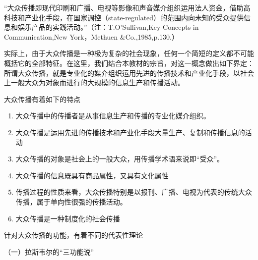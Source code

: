 \documentclass[UTF8,12pt]{ctexart}
\numberwithin{equation}{section} %
\numberwithin{figure}{section}
\numberwithin{table}{section}
\begin{document}
	“大众传播即现代印刷和广播、电视等影像和声音媒介组织运用法人资金，借助高科技和产业化手段，在国家调控（state-regulated）的范围内向未知的受众提供信息和娱乐产品的实践活动。”（注：T.O'Sullivan,Key Concepts in Communication,New York，Methuen \&Co.,1985,p.130.）
	
	实际上，由于大众传播是一种极为复杂的社会现象，任何一个简短的定义都不可能概括它的全部特征。在这里，我们结合本教材的宗旨，对这一概念做出如下界定：所谓大众传播，就是专业化的媒介组织运用先进的传播技术和产业化手段，以社会上一般大众为对象而进行的大规模的信息生产和传播活动。
	
	大众传播有着如下的特点
	\begin{enumerate}
		\item 大众传播中的传播者是从事信息生产和传播的专业化媒介组织。
		
		\item 大众传播是运用先进的传播技术和产业化手段大量生产、复制和传播信息的活动
		
		\item 大众传播的对象是社会上的一般大众，用传播学术语来说即“受众”。
		
		\item 大众传播的信息既具有商品属性，又具有文化属性
		
		\item 传播过程的性质来看，大众传播特别是以报刊、广播、电视为代表的传统大众传播，属于单向性很强的传播活动。
		
		\item 大众传播是一种制度化的社会传播
	\end{enumerate}

	
	针对大众传播的功能，有着不同的代表性理论
	
	（一）拉斯韦尔的“三功能说”
	
\end{document}
